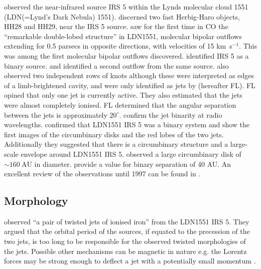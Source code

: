 \cite{1976AJ.....81..638S} observed the near-infrared source IRS 5 within the Lynds molecular cloud 1551 (LDN(=Lynd's Dark Nebula) 1551).
\cite{1979AJ.....84..548C} discerned two fast Herbig-Haro objects, HH28 and HH29, near the IRS 5 source.
\cite{1980ApJ...239L..17S} saw for the first time in CO the ``remarkable double-lobed
structure'' in LDN1551, molecular bipolar outflows extending for 0.5 parsecs in opposite directions, with velocities of 15 km~s$^{-1}$.
This was among the first molecular bipolar outflows discovered.
\citet{1985ApJ...289L...5B} identified IRS 5 as a binary source.
\citet{1991ApJ...373L..23M} and \citet{1991ApJ...383..705P} identified a second outflow from the same source.
\citet{1991A&A...252..740M} also observed two independent rows of knots although these were interpreted as edges of a limb-brightened cavity, and were only identified as jets by \citet{1998ApJ...499L..75F} (hereafter FL). 
FL opined that only one jet is currently active.
They also estimated that the jets were almost completely ionised.
FL determined that the angular separation between the jets is approximately $20^{\circ}$. 
\citet{2003ApJ...586L.137R} confirm the jet binarity at radio
wavelengths. 
\citet{1998Natur.395..355R} confirmed that LDN1551 IRS 5 was a binary system and show the first images of the circumbinary disks and the red lobes of the two jets.
Additionally they suggested that there is a circumbinary structure and a large-scale envelope around LDN1551 IRS 5.
\citet{1994ApJ...434L..75L} observed a large circumbinary disk of $\sim 160~\mathrm{AU}$ in diameter.
\citet{2005ApJ...L} provide a value for binary separation of 40 AU. 
An excellent review of the observations until 1997 can be found in \citet{1997IAUS..182...19F}.

\subsection{Morphology}
\citet{2000PASJ...52...81I} observed ``a pair of twisted jets of ionised iron'' from the LDN1551 IRS 5.
They argued that the orbital period of the sources, if equated to the precession of the two jets, is too long to be responsible for the observed twisted morphologies of the jets.
Possible other mechanisms can be magnetic in nature e.g. the Lorentz forces may be strong enough to deflect a jet with a potentially small momentum \citep{1998A&A...334..750F,2000IAUS..200P.112F}. 



